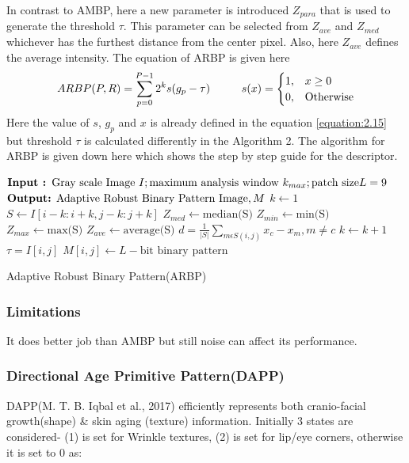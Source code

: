 \documentclass[12pt]{article}
\newcommand\tab[1][1cm]{\hspace*{#1}}
\begin{document}
In contrast to AMBP, here a new parameter is introduced $Z_{para}$ that is used to generate the threshold $\tau$. This parameter can be selected from $Z_{ave}$ and $Z_{med}$ whichever has the furthest distance from the center pixel. Also, here $Z_{ave}$ defines the average intensity. The equation of ARBP is given here
\begin{equation}
ARBP(P,R)=\sum\limits_{p=0}^{P-1}{{{2}^{k}}s(g_p-\tau)} \tab  s(x)= 
\begin{cases}
1,&  x\geq 0\\
0,&  \text{Otherwise}
\end{cases}
\label{equation:2.20}
\end{equation}
Here the value of $s$, $g_p$ and $x$ is already defined in the equation \ref{equation:2.15} but threshold $\tau$ is calculated differently in the Algorithm 2. The algorithm for ARBP is given down here which shows the step by step guide for the descriptor.\\
\begin{algorithm}[H]
	$\text{\textbf{Input : }Gray scale Image}~ I; \text{maximum analysis window }k_{max}; \text{patch size} L = 9$\;
	$\text{\textbf{Output:} Adaptive Robust Binary Pattern Image}, M$\;
	{
		$k \gets 1$ \;
		{
			$S \gets I[i-k:i+k, j-k : j+k]$ \;
			$Z_{med} \gets \text{median(S)}$ \;
			$Z_{min} \gets \text{min(S)}$\;
			$Z_{max} \gets \text{max(S)}$\;
			$Z_{ave} \gets \text{average(S)}$\;
			$ d =\frac{1}{|S|}\sum\limits_{m\epsilon S(i,j)}{x_c - x_m}, m \neq c$\;
			$k \gets k+1$ \;	
		}
		{$\tau = I[i,j]$}
		$M[i,j] \gets L-\text{bit binary pattern}$	
	}
	\caption{Adaptive Robust Binary Pattern(ARBP)}
\end{algorithm}

\subsubsection*{Limitations}
It does better job than AMBP but still noise can affect its performance.\\


\subsubsection{Directional Age Primitive Pattern(DAPP)}
DAPP(M. T. B. Iqbal et al., 2017)\cite{dapp01} efficiently represents both cranio-facial growth(shape) \& skin aging (texture) information.
Initially 3 states are considered- (1) is set for Wrinkle textures, (2) is set for lip/eye corners, otherwise it is set to 0 as:\\
\end{document}
